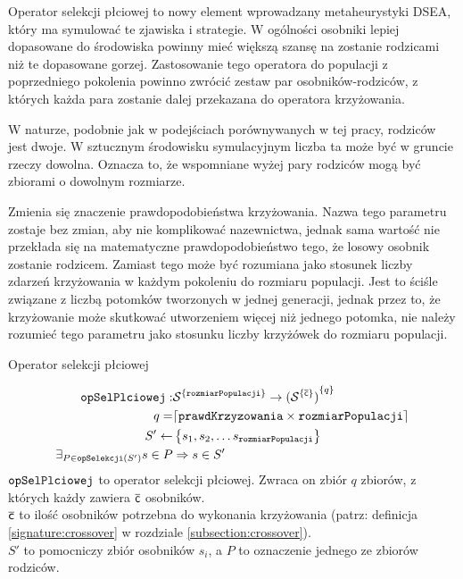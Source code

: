 \documentclass[./FM_mgr.tex]{subfiles}
\begin{document}
Operator selekcji płciowej to nowy element wprowadzany metaheurystyki DSEA, który ma symulować te zjawiska i strategie.
W ogólności osobniki lepiej dopasowane do środowiska powinny mieć większą szansę na zostanie rodzicami niż te dopasowane gorzej.
Zastosowanie tego operatora do populacji z poprzedniego pokolenia powinno zwrócić zestaw par osobników-rodziców, z których każda para zostanie dalej przekazana do operatora krzyżowania.

W naturze, podobnie jak w podejściach porównywanych w tej pracy, rodziców jest dwoje. 
W sztucznym środowisku symulacyjnym liczba ta może być w gruncie rzeczy dowolna. 
Oznacza to, że wspomniane wyżej pary rodziców mogą być zbiorami o dowolnym rozmiarze.

Zmienia się znaczenie prawdopodobieństwa krzyżowania. 
Nazwa tego parametru zostaje bez zmian, aby nie komplikować nazewnictwa, jednak sama wartość nie przekłada się na matematyczne prawdopodobieństwo tego, że losowy osobnik zostanie rodzicem. 
Zamiast tego może być rozumiana jako stosunek liczby zdarzeń krzyżowania w każdym pokoleniu do rozmiaru populacji. 
Jest to ściśle związane z liczbą potomków tworzonych w jednej generacji, jednak przez to, że krzyżowanie może skutkować utworzeniem więcej niż jednego potomka, nie należy rozumieć tego parametru jako stosunku liczby krzyżówek do rozmiaru populacji.

\begin{signature}
	\caption{Operator selekcji płciowej \label{signature:genSel}}
	\begin{align}
	\mathtt{opSelPlciowej}: &{ \mathcal{S}}^{ \{ \mathtt{rozmiarPopulacji}  \}} \rightarrow { ( {\mathcal{S}  }^{ \{ \mathsf{\overline{c}} \}} ) }^{ \{ q \}} \\
	q = & \lceil \mathtt{prawdKrzyzowania} \times \mathtt{rozmiarPopulacji} \rceil \\
	S' \gets &\left\{ s_1, s_2, \ldots s_{\mathtt{rozmiarPopulacji}} \right\} \\
	\exists_{P \in \mathtt{opSelekcji}(S')} s \in P &\Rightarrow s \in S'\\
	\end{align}	
	$\mathtt{opSelPlciowej}$ to operator selekcji płciowej.
	Zwraca on zbiór $q$ zbiorów, z których każdy zawiera $\mathsf{\overline{c}}$ osobników. \\
	$\mathsf{\overline{c}}$ to ilość osobników potrzebna do wykonania krzyżowania (patrz: definicja \ref{signature:crossover} w rozdziale \ref{subsection:crossover}). \\
	$S'$ to pomocniczy zbiór osobników $s_i$, a $P$ to oznaczenie jednego ze zbiorów rodziców.
\end{signature}
\end{document}

